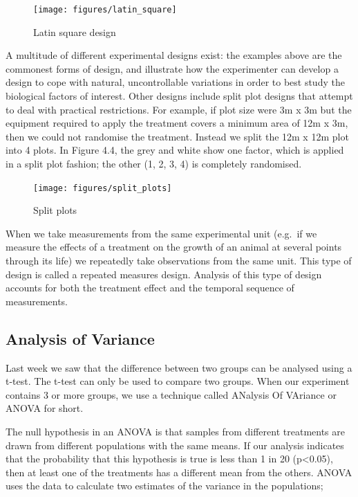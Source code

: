 \documentclass[
]{book}
\begin{document}
\begin{figure}
\texttt{[image: figures/latin\_square]} \caption{Latin square design}\label{fig:unnamed-chunk-45}
\end{figure}

A multitude of different experimental designs exist: the examples above are the commonest forms of design, and illustrate how the experimenter can develop a design to cope with natural, uncontrollable variations in order to best study the biological factors of interest. Other designs include split plot designs that attempt to deal with practical restrictions. For example, if plot size were 3m x 3m but the equipment required to apply the treatment covers a minimum area of 12m x 3m, then we could not randomise the treatment. Instead we split the 12m x 12m plot into 4 plots. In Figure 4.4, the grey and white show one factor, which is applied in a split plot fashion; the other (1, 2, 3, 4) is completely randomised.

\begin{figure}
\texttt{[image: figures/split\_plots]} \caption{Split plots}\label{fig:unnamed-chunk-46}
\end{figure}

When we take measurements from the same experimental unit (e.g.~if we measure the effects of a treatment on the growth of an animal at several points through its life) we repeatedly take observations from the same unit. This type of design is called a repeated measures design. Analysis of this type of design accounts for both the treatment effect and the temporal sequence of measurements.

\subsection*{Analysis of Variance}\label{analysis-of-variance}

Last week we saw that the difference between two groups can be analysed using a t-test. The t-test can only be used to compare two groups. When our experiment contains 3 or more groups, we use a technique called ANalysis Of VAriance or ANOVA for short.

The null hypothesis in an ANOVA is that samples from different treatments are drawn from different populations with the same means. If our analysis indicates that the probability that this hypothesis is true is less than 1 in 20 (p\textless0.05), then at least one of the treatments has a different mean from the others. ANOVA uses the data to calculate two estimates of the variance in the populations;
\end{document}
